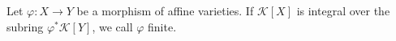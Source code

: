 Let $\varphi: X \rightarrow Y$ be a morphism of affine varieties. If $\mathcal{K}[X]$ is integral over the subring $\varphi^*\mathcal{K}[Y]$, we call $\varphi$ finite.
